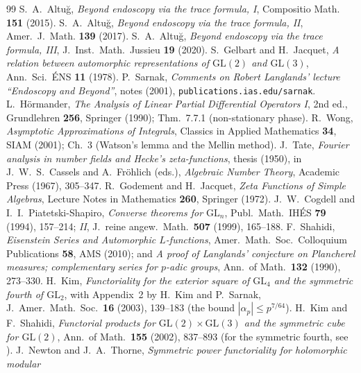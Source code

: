 \documentclass[11pt]{article}
\theoremstyle{definition}
\begin{document}
\begin{thebibliography}{99}
 S.~A.~Altu\u{g}, \emph{Beyond endoscopy via the trace formula, I}, Compositio Math.
\textbf{151} (2015).
 S.~A.~Altu\u{g}, \emph{Beyond endoscopy via the trace formula, II}, Amer.\ J.\ Math.
\textbf{139} (2017).
 S.~A.~Altu\u{g}, \emph{Beyond endoscopy via the trace formula, III}, J.\ Inst.\
Math.\ Jussieu \textbf{19} (2020).
 S.~Gelbart and H.~Jacquet, \emph{A relation between automorphic representations of
$\mathrm{GL}(2)$ and $\mathrm{GL}(3)$}, Ann.\ Sci.\ \'ENS \textbf{11} (1978).
\bibitem{Sar} P.~Sarnak, \emph{Comments on Robert Langlands' lecture ``Endoscopy and Beyond''}, notes
(2001), \texttt{publications.ias.edu/sarnak}.
 L.~H\"ormander, \emph{The Analysis of Linear Partial Differential Operators I},
2nd ed., Grundlehren \textbf{256}, Springer (1990); Thm.~7.7.1 (non-stationary phase).
\bibitem{Wong} R.~Wong, \emph{Asymptotic Approximations of Integrals}, Classics in Applied
Mathematics \textbf{34}, SIAM (2001); Ch.~3 (Watson's lemma and the Mellin method).
\bibitem{Tate} J.~Tate, \emph{Fourier analysis in number fields and Hecke's zeta-functions}, thesis
(1950), in J.~W.~S.~Cassels and A.~Fr\"ohlich (eds.), \emph{Algebraic Number Theory}, Academic Press
(1967), 305--347.
 R.~Godement and H.~Jacquet, \emph{Zeta Functions of Simple Algebras}, Lecture Notes in
Mathematics \textbf{260}, Springer (1972).
 J.~W.~Cogdell and I.~I.~Piatetski-Shapiro, \emph{Converse theorems for
$\mathrm{GL}_n$}, Publ.\ Math.\ IH\'ES \textbf{79} (1994), 157--214; \emph{II}, J.\ reine angew.\
Math.\ \textbf{507} (1999), 165--188.
\bibitem{Shahidi} F.~Shahidi, \emph{Eisenstein Series and Automorphic $L$-functions}, Amer.\ Math.\
Soc.\ Colloquium Publications \textbf{58}, AMS (2010); and \emph{A proof of Langlands' conjecture on
Plancherel measures; complementary series for $p$-adic groups}, Ann.\ of Math.\ \textbf{132} (1990),
273--330.
\bibitem{KimSarnak} H.~Kim, \emph{Functoriality for the exterior square of $\mathrm{GL}_4$ and the symmetric
fourth of $\mathrm{GL}_2$}, with Appendix~2 by H.~Kim and P.~Sarnak, J.\ Amer.\ Math.\ Soc.\ \textbf{16}
(2003), 139--183 (the bound $|\alpha_p|\le p^{7/64}$).
\bibitem{KimShahidi} H.~Kim and F.~Shahidi, \emph{Functorial products for
$\mathrm{GL}(2)\times\mathrm{GL}(3)$ and the symmetric cube for $\mathrm{GL}(2)$}, Ann.\ of Math.\
\textbf{155} (2002), 837--893 (for the symmetric fourth, see \cite{KimSarnak}).
\bibitem{NT} J.~Newton and J.~A.~Thorne, \emph{Symmetric power functoriality for holomorphic modular
}
\end{thebibliography}
\end{document}
